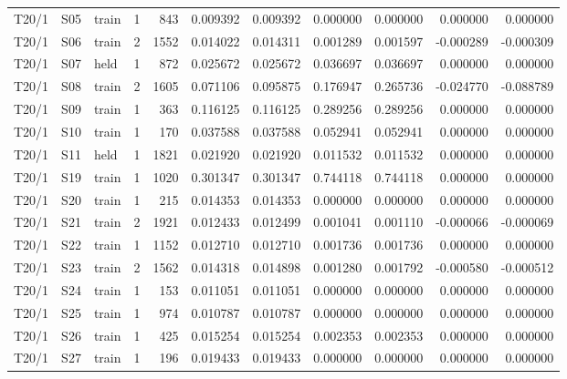 {\begin{longtable}{@{}lllrrrrrrrr@{}}
T20/1 & S05 & train & 1 & 843 & 0.009392 & 0.009392 & 0.000000 & 0.000000 & 0.000000 & 0.000000 \\
T20/1 & S06 & train & 2 & 1552 & 0.014022 & 0.014311 & 0.001289 & 0.001597 & -0.000289 & -0.000309 \\
T20/1 & S07 & held & 1 & 872 & 0.025672 & 0.025672 & 0.036697 & 0.036697 & 0.000000 & 0.000000 \\
T20/1 & S08 & train & 2 & 1605 & 0.071106 & 0.095875 & 0.176947 & 0.265736 & -0.024770 & -0.088789 \\
T20/1 & S09 & train & 1 & 363 & 0.116125 & 0.116125 & 0.289256 & 0.289256 & 0.000000 & 0.000000 \\
T20/1 & S10 & train & 1 & 170 & 0.037588 & 0.037588 & 0.052941 & 0.052941 & 0.000000 & 0.000000 \\
T20/1 & S11 & held & 1 & 1821 & 0.021920 & 0.021920 & 0.011532 & 0.011532 & 0.000000 & 0.000000 \\
T20/1 & S19 & train & 1 & 1020 & 0.301347 & 0.301347 & 0.744118 & 0.744118 & 0.000000 & 0.000000 \\
T20/1 & S20 & train & 1 & 215 & 0.014353 & 0.014353 & 0.000000 & 0.000000 & 0.000000 & 0.000000 \\
T20/1 & S21 & train & 2 & 1921 & 0.012433 & 0.012499 & 0.001041 & 0.001110 & -0.000066 & -0.000069 \\
T20/1 & S22 & train & 1 & 1152 & 0.012710 & 0.012710 & 0.001736 & 0.001736 & 0.000000 & 0.000000 \\
T20/1 & S23 & train & 2 & 1562 & 0.014318 & 0.014898 & 0.001280 & 0.001792 & -0.000580 & -0.000512 \\
T20/1 & S24 & train & 1 & 153 & 0.011051 & 0.011051 & 0.000000 & 0.000000 & 0.000000 & 0.000000 \\
T20/1 & S25 & train & 1 & 974 & 0.010787 & 0.010787 & 0.000000 & 0.000000 & 0.000000 & 0.000000 \\
T20/1 & S26 & train & 1 & 425 & 0.015254 & 0.015254 & 0.002353 & 0.002353 & 0.000000 & 0.000000 \\
T20/1 & S27 & train & 1 & 196 & 0.019433 & 0.019433 & 0.000000 & 0.000000 & 0.000000 & 0.000000 \\
\end{longtable}
}

